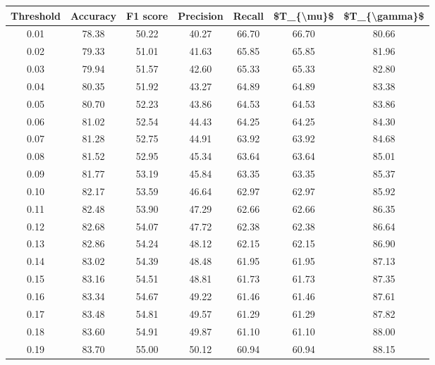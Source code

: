 \begin{tabular}{|c|c|c|c|c|c|c|}
\hline
 Threshold &  Accuracy &  F1 score &  Precision &  Recall &  \$T\_\{\textbackslash mu\}\$ &  \$T\_\{\textbackslash gamma\}\$ \\
\hline
      0.01 &     78.38 &     50.22 &      40.27 &   66.70 &      66.70 &         80.66 \\
      0.02 &     79.33 &     51.01 &      41.63 &   65.85 &      65.85 &         81.96 \\
      0.03 &     79.94 &     51.57 &      42.60 &   65.33 &      65.33 &         82.80 \\
      0.04 &     80.35 &     51.92 &      43.27 &   64.89 &      64.89 &         83.38 \\
      0.05 &     80.70 &     52.23 &      43.86 &   64.53 &      64.53 &         83.86 \\
      0.06 &     81.02 &     52.54 &      44.43 &   64.25 &      64.25 &         84.30 \\
      0.07 &     81.28 &     52.75 &      44.91 &   63.92 &      63.92 &         84.68 \\
      0.08 &     81.52 &     52.95 &      45.34 &   63.64 &      63.64 &         85.01 \\
      0.09 &     81.77 &     53.19 &      45.84 &   63.35 &      63.35 &         85.37 \\
      0.10 &     82.17 &     53.59 &      46.64 &   62.97 &      62.97 &         85.92 \\
      0.11 &     82.48 &     53.90 &      47.29 &   62.66 &      62.66 &         86.35 \\
      0.12 &     82.68 &     54.07 &      47.72 &   62.38 &      62.38 &         86.64 \\
      0.13 &     82.86 &     54.24 &      48.12 &   62.15 &      62.15 &         86.90 \\
      0.14 &     83.02 &     54.39 &      48.48 &   61.95 &      61.95 &         87.13 \\
      0.15 &     83.16 &     54.51 &      48.81 &   61.73 &      61.73 &         87.35 \\
      0.16 &     83.34 &     54.67 &      49.22 &   61.46 &      61.46 &         87.61 \\
      0.17 &     83.48 &     54.81 &      49.57 &   61.29 &      61.29 &         87.82 \\
      0.18 &     83.60 &     54.91 &      49.87 &   61.10 &      61.10 &         88.00 \\
      0.19 &     83.70 &     55.00 &      50.12 &   60.94 &      60.94 &         88.15 \\

\end{tabular}
